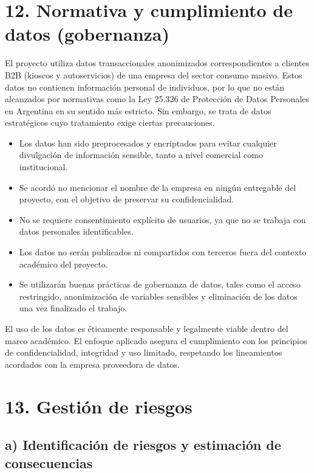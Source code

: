 \documentclass[
11pt, %
]{charter}
\begin{document}
\section{12. Normativa y cumplimiento de datos (gobernanza)}

El proyecto utiliza datos transaccionales anonimizados correspondientes a clientes B2B (kioscos y autoservicios) de una empresa del sector consumo masivo. Estos datos no contienen información personal de individuos, por lo que no están alcanzados por normativas como la Ley 25.326 de Protección de Datos Personales en Argentina en su sentido más estricto. Sin embargo, se trata de datos estratégicos cuyo tratamiento exige ciertas precauciones.

\begin{itemize}
\item Los datos han sido preprocesados y encriptados para evitar cualquier divulgación de información sensible, tanto a nivel comercial como institucional.
\item Se acordó no mencionar el nombre de la empresa en ningún entregable del proyecto, con el objetivo de preservar su confidencialidad.
\item No se requiere consentimiento explícito de usuarios, ya que no se trabaja con datos personales identificables.
\item Los datos no serán publicados ni compartidos con terceros fuera del contexto académico del proyecto.
\item Se utilizarán buenas prácticas de gobernanza de datos, tales como el acceso restringido, anonimización de variables sensibles y eliminación de los datos una vez finalizado el trabajo.
\end{itemize}

El uso de los datos es éticamente responsable y legalmente viable dentro del marco académico. El enfoque aplicado asegura el cumplimiento con los principios de confidencialidad, integridad y uso limitado, respetando los lineamientos acordados con la empresa proveedora de datos.

\section{13. Gestión de riesgos}
\label{sec:riesgos}

\subsection*{a) Identificación de riesgos y estimación de consecuencias}
\end{document}
